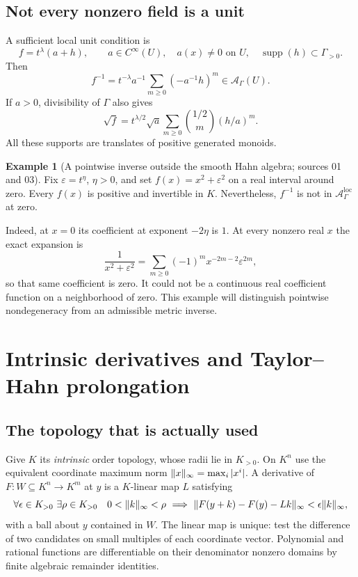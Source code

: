 \documentclass[11pt,letterpaper]{article}
\theoremstyle{definition}
\newtheorem{example}[theorem]{Example}
\theoremstyle{remark}
\newcommand{\A}{\mathscr A}\newcommand{\OO}{\mathcal O}\newcommand{\mm}{\mathfrak m}
\newcommand{\supp}{\operatorname{supp}}\newcommand{\st}{\operatorname{st}}
\newcommand{\eps}{\varepsilon}
\begin{document}
\subsection{Not every nonzero field is a unit}\label{vtf:subsec:units}

A sufficient local unit condition is
\begin{equation}\label{vtf:eq:unit}
 f=t^\lambda(a+h),\qquad a\in C^\infty(U),\quad a(x)\ne0\text{ on }U,
 \quad \supp(h)\subset\Gamma_{>0}.
\end{equation}
Then
\[
 f^{-1}=t^{-\lambda}a^{-1}
       \sum_{m\ge0}(-a^{-1}h)^m\in\A_\Gamma(U).
\]
If $a>0$, divisibility of $\Gamma$ also gives
\[
 \sqrt f=t^{\lambda/2}\sqrt a
   \sum_{m\ge0}\binom{1/2}{m}(h/a)^m.
\]
All these supports are translates of positive generated monoids.

\begin{example}[A pointwise inverse outside the smooth Hahn algebra; sources 01 and 03]
Fix $\eps=t^\eta$, $\eta>0$, and set $f(x)=x^2+\eps^2$ on a real interval
around zero. Every $f(x)$ is positive and invertible in $K$. Nevertheless,
$f^{-1}$ is not in $\A^{\mathrm{loc}}_\Gamma$ at zero.

Indeed, at $x=0$ its coefficient at exponent $-2\eta$ is $1$. At every
nonzero real $x$ the exact expansion is
\[
 \frac1{x^2+\eps^2}=\sum_{m\ge0}(-1)^m x^{-2m-2}\eps^{2m},
\]
so that same coefficient is zero. It could not be a continuous real
coefficient function on a neighborhood of zero. This example will distinguish
pointwise nondegeneracy from an admissible metric inverse.
\end{example}

\section{Intrinsic derivatives and Taylor--Hahn prolongation}\label{vtf:sec:prolong}

\subsection{The topology that is actually used}

Give $K$ its \emph{intrinsic} order topology, whose radii lie in $K_{>0}$.
On $K^n$ use the equivalent coordinate maximum norm
$\lVert x\rVert_\infty=\max_i|x^i|$. A derivative of $F:W\subseteq K^n\to K^m$
at $y$ is a $K$-linear map $L$ satisfying
\begin{equation}\label{vtf:eq:fineder}
 \forall\epsilon\in K_{>0}\ \exists\rho\in K_{>0}\quad
 0<\lVert k\rVert_\infty<\rho\ \Longrightarrow\
 \lVert F(y+k)-F(y)-Lk\rVert_\infty<\epsilon\lVert k\rVert_\infty,
\end{equation}
with a ball about $y$ contained in $W$. The linear map is unique: test the
difference of two candidates on small multiples of each coordinate vector.
Polynomial and rational functions are differentiable on their denominator
nonzero domains by finite algebraic remainder identities.
\end{document}
